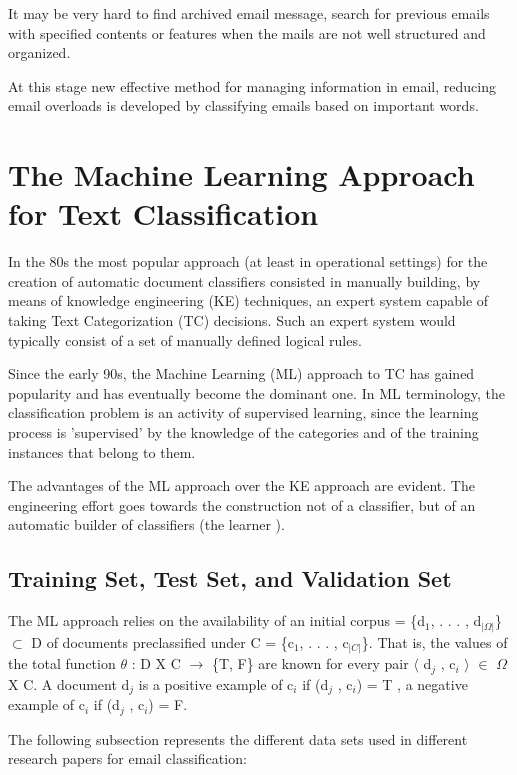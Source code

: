 It may be very hard to find archived email message, search for previous emails with specified contents or features when the mails are not well structured and organized.

At this stage new effective method for managing information in email, reducing email overloads is developed by classifying emails based on important words. \cite{taiwo2007}

\section{The Machine Learning Approach for Text Classification}

In the 80s the most popular approach (at least in operational settings) for the
creation of automatic document classiﬁers consisted in manually building, by means
of knowledge engineering (KE) techniques, an expert system capable of taking Text Categorization (TC) decisions. Such an expert system would typically consist of a set of manually deﬁned logical rules.

Since the early 90s, the Machine Learning (ML) approach to TC has gained popularity and has eventually become the dominant one. In ML terminology, the classification problem is an activity of supervised learning, since the learning process is 'supervised' by the knowledge of
the categories and of the training instances that belong to them.

The advantages of the ML approach over the KE approach are evident. The engineering eﬀort goes towards the construction not of a classiﬁer, but of an automatic builder of classiﬁers (the learner ). \cite{Sebastiani2002}

\subsection{Training Set, Test Set, and Validation Set}
The ML approach relies on the availability of an initial corpus = \{d$_{1}$, . . . , d$_{|\Omega|}$\} $\subset$ D of documents preclassified under C = \{c$_{1}$, . . . , c$_{|C|}$\}. That is, the values of the total function $\theta$ : D X C $\rightarrow$ \{T, F\} are known for every pair $\langle$ d$_{j}$ , c$_{i}$ $\rangle$ $\in$   $\Omega$ X C. A document d$_{j}$ is a positive example of c$_{i}$ if (d$_{j}$ , c$_{i}$) = T , a negative example of c$_{i}$ if
(d$_{j}$ , c$_{i}$) = F.

The following subsection represents the different data sets used  in different research papers for email classification:

